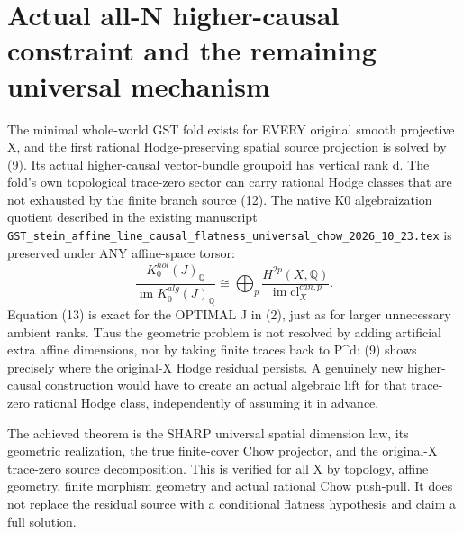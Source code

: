 \documentclass[11pt]{article}
\begin{document}
\section{Actual all-N higher-causal constraint and the remaining universal mechanism}
The minimal whole-world GST fold
exists for EVERY original smooth
projective X, and the first
rational Hodge-preserving
spatial source projection is
solved by (9). Its actual
higher-causal vector-bundle
groupoid has vertical rank d.
The fold's own topological
trace-zero sector can carry
rational Hodge classes that
are not exhausted by the
finite branch source (12).
The native K0 algebraization
quotient described in the
existing manuscript
\texttt{GST\_stein\_affine\_line\_causal\_flatness\_universal\_chow\_2026\_10\_23.tex}
is preserved under ANY
affine-space torsor:
\[
 \frac{K_0^{hol}(J)_\mathbb Q}
 {\operatorname{im}K_0^{alg}(J)_\mathbb Q}
 \cong\bigoplus_p
 \frac{H^{2p}(X,\mathbb Q)}
 {\operatorname{im}\mathrm{cl}_X^{can,p}} .
 \tag{13}
\]
Equation (13) is exact for the
OPTIMAL J in (2), just as
for larger unnecessary ambient
ranks. Thus the geometric
problem is not resolved by
adding artificial extra affine
dimensions, nor by taking
finite traces back to P^d:
(9) shows precisely where
the original-X Hodge residual
persists. A genuinely new
higher-causal construction
would have to create an actual
algebraic lift for that
trace-zero rational Hodge
class, independently of
assuming it in advance.

The achieved theorem is the
SHARP universal spatial
dimension law, its geometric
realization, the true
finite-cover Chow projector,
and the original-X trace-zero
source decomposition.
This is verified for all X by
topology, affine geometry,
finite morphism geometry
and actual rational Chow
push-pull. It does not replace
the residual source with a
conditional flatness hypothesis
and claim a full solution.
\end{document}
